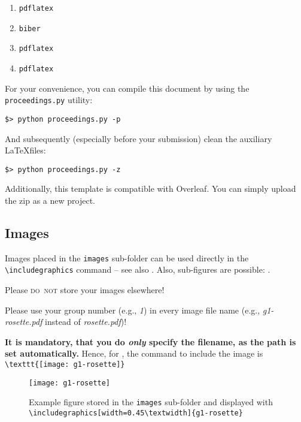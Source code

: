 \begin{enumerate}
    \item \verb|pdflatex| \rootDocument
    \item \verb|biber| \rootName
    \item \verb|pdflatex| \rootDocument
    \item \verb|pdflatex| \rootDocument
\end{enumerate}

For your convenience, you can compile this document by using the \texttt{proceedings.py} utility:

\begin{center}
    \verb|$> python proceedings.py -p|
\end{center}

And subsequently (especially before your submission) clean the auxiliary \LaTeX files:

\begin{center}
    \verb|$> python proceedings.py -z|
\end{center}

Additionally, this template is compatible with Overleaf. You can simply upload the zip as a new project.



\subsection*{Images}
Images placed in the \texttt{images} sub-folder can be used directly in the \texttt{\textbackslash includegraphics} command -- see also . Also, sub-figures are possible: .

Please \textsc{do~not} store your images elsewhere! 

Please use your group number (e.g., \textit{1}) in every image file name (e.g., \textit{g1-rosette.pdf} instead of \textit{rosette.pdf})!

\textbf{It is mandatory, that you do \emph{only} specify the filename, as the path is set automatically.} Hence, for , the command to include the image is \verb|\texttt{[image: g1-rosette]}|

\begin{figure}[tb]
\centering
\texttt{[image: g1-rosette]}
\caption{Example figure stored in the \texttt{images} sub-folder and displayed with \texttt{\textbackslash includegraphics[width=0.45\textbackslash textwidth]\{g1-rosette\}}}
\label{fig:rosette}
\end{figure}

